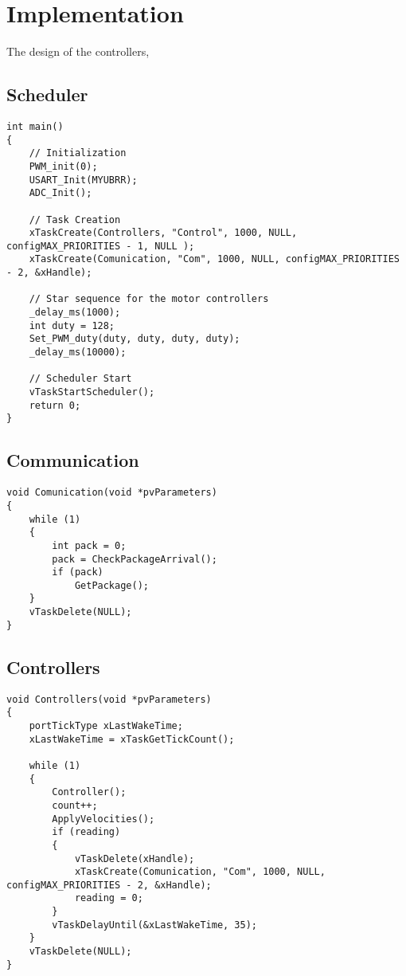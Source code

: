 \chapter{Implementation}

The design of the controllers,  



\section{Scheduler}
\begin{lstlisting}[style=customcpp,
                    caption={Code for initialization, creation of the different tasks, start sequence for the motors and call to the scheduler.}, 
                    label=lst:scheduler]
int main()
{
    // Initialization
    PWM_init(0);
    USART_Init(MYUBRR);
    ADC_Init();
    
    // Task Creation
    xTaskCreate(Controllers, "Control", 1000, NULL, configMAX_PRIORITIES - 1, NULL );
    xTaskCreate(Comunication, "Com", 1000, NULL, configMAX_PRIORITIES - 2, &xHandle);
    
    // Star sequence for the motor controllers
    _delay_ms(1000);
    int duty = 128;
    Set_PWM_duty(duty, duty, duty, duty);
    _delay_ms(10000);
 
    // Scheduler Start
    vTaskStartScheduler();
    return 0;
}                    
\end{lstlisting}


\section{Communication}
\begin{lstlisting}[style=customcpp,
                caption={Code for the comunication task.}, 
                label=lst:scheduler]
void Comunication(void *pvParameters)
{
    while (1)
    {
        int pack = 0;
        pack = CheckPackageArrival();
        if (pack)
            GetPackage();
    }
    vTaskDelete(NULL);
}
\end{lstlisting}


\section{Controllers}
\begin{lstlisting}[style=customcpp,
caption={Code for the controller task.}, 
label=lst:scheduler]
void Controllers(void *pvParameters)
{
    portTickType xLastWakeTime;
    xLastWakeTime = xTaskGetTickCount();
    
    while (1)
    {
        Controller();
        count++;
        ApplyVelocities();
        if (reading)
        {
            vTaskDelete(xHandle);
            xTaskCreate(Comunication, "Com", 1000, NULL, configMAX_PRIORITIES - 2, &xHandle);
            reading = 0;
        }
        vTaskDelayUntil(&xLastWakeTime, 35);
    }
    vTaskDelete(NULL);
}
\end{lstlisting}


